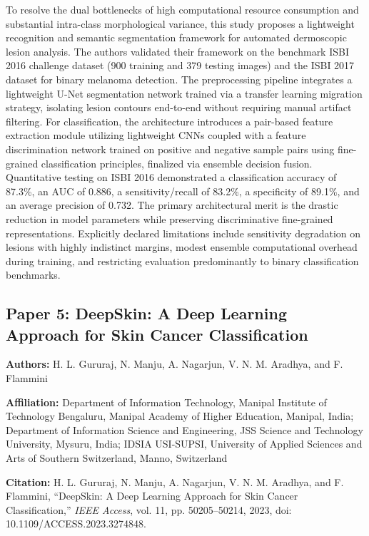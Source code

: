\documentclass[conference]{IEEEtran}
\begin{document}
To resolve the dual bottlenecks of high computational resource consumption and substantial intra-class morphological variance, this study proposes a lightweight recognition and semantic segmentation framework for automated dermoscopic lesion analysis. The authors validated their framework on the benchmark ISBI 2016 challenge dataset (900 training and 379 testing images) and the ISBI 2017 dataset for binary melanoma detection. The preprocessing pipeline integrates a lightweight U-Net segmentation network trained via a transfer learning migration strategy, isolating lesion contours end-to-end without requiring manual artifact filtering. For classification, the architecture introduces a pair-based feature extraction module utilizing lightweight CNNs coupled with a feature discrimination network trained on positive and negative sample pairs using fine-grained classification principles, finalized via ensemble decision fusion. Quantitative testing on ISBI 2016 demonstrated a classification accuracy of 87.3\%, an AUC of 0.886, a sensitivity/recall of 83.2\%, a specificity of 89.1\%, and an average precision of 0.732. The primary architectural merit is the drastic reduction in model parameters while preserving discriminative fine-grained representations. Explicitly declared limitations include sensitivity degradation on lesions with highly indistinct margins, modest ensemble computational overhead during training, and restricting evaluation predominantly to binary classification benchmarks.

\subsection{Paper 5: DeepSkin: A Deep Learning Approach for Skin Cancer Classification}

\textbf{Authors:} H. L. Gururaj, N. Manju, A. Nagarjun, V. N. M. Aradhya, and F. Flammini

\textbf{Affiliation:} Department of Information Technology, Manipal Institute of Technology Bengaluru, Manipal Academy of Higher Education, Manipal, India; Department of Information Science and Engineering, JSS Science and Technology University, Mysuru, India; IDSIA USI-SUPSI, University of Applied Sciences and Arts of Southern Switzerland, Manno, Switzerland

\textbf{Citation:} H. L. Gururaj, N. Manju, A. Nagarjun, V. N. M. Aradhya, and F. Flammini, ``DeepSkin: A Deep Learning Approach for Skin Cancer Classification,'' \textit{IEEE Access}, vol. 11, pp. 50205--50214, 2023, doi: 10.1109/ACCESS.2023.3274848.
\end{document}
